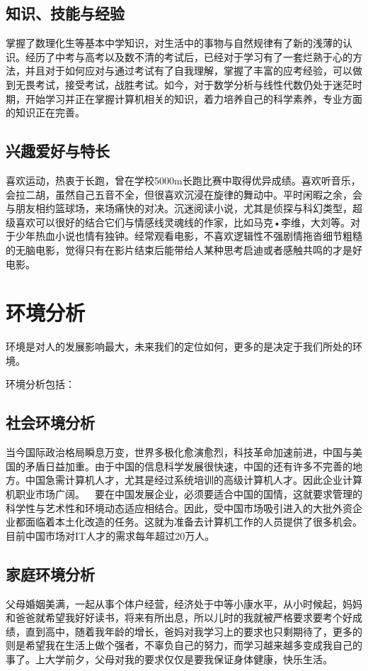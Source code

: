 \documentclass{article}
\begin{document}
\subsection{知识、技能与经验}
掌握了数理化生等基本中学知识，对生活中的事物与自然规律有了新的浅薄的认识。经历了中考与高考以及数不清的考试后，已经对于学习有了一套烂熟于心的方法，并且对于如何应对与通过考试有了自我理解，掌握了丰富的应考经验，可以做到无畏考试，接受考试，战胜考试。如今，对于数学分析与线性代数仍处于迷茫时期，开始学习并正在掌握计算机相关的知识，着力培养自己的科学素养，专业方面的知识正在完善。\par
\subsection{兴趣爱好与特长}
喜欢运动，热衷于长跑，曾在学校5000m长跑比赛中取得优异成绩。喜欢听音乐，会拉二胡，虽然自己五音不全，但很喜欢沉浸在旋律的舞动中。平时闲暇之余，会与朋友相约篮球场，来场痛快的对决。沉迷阅读小说，尤其是侦探与科幻类型，超级喜欢可以很好的结合它们与情感线灵魂线的作家，比如马克•李维，大刘等。对于少年热血小说也情有独钟。经常观看电影，不喜欢逻辑性不强剧情拖沓细节粗糙的无脑电影，觉得只有在影片结束后能带给人某种思考启迪或者感触共鸣的才是好电影。\par
\section{环境分析}
环境是对人的发展影响最大，未来我们的定位如何，更多的是决定于我们所处的环境。\par
环境分析包括：\par
\subsection{社会环境分析}
当今国际政治格局瞬息万变，世界多极化愈演愈烈，科技革命加速前进，中国与美国的矛盾日益加重。由于中国的信息科学发展很快速，中国的还有许多不完善的地方。中国急需计算机人才，尤其是经过系统培训的高级计算机人才。因此企业计算机职业市场广阔。  要在中国发展企业，必须要适合中国的国情，这就要求管理的科学性与艺术性和环境动态适应相结合。因此，受中国市场吸引进入的大批外资企业都面临着本土化改造的任务。这就为准备去计算机工作的人员提供了很多机会。目前中国市场对IT人才的需求每年超过20万人。\par
\subsection{家庭环境分析}
父母婚姻美满，一起从事个体户经营，经济处于中等小康水平，从小时候起，妈妈和爸爸就希望我好好读书，将来有所出息，所以儿时的我就被严格要求要考个好成绩，直到高中，随着我年龄的增长，爸妈对我学习上的要求也只剩期待了，更多的则是希望我在生活上做个强者，不辜负自己的努力，而学习越来越多变成我自己的事了。上大学前夕，父母对我的要求仅仅是要我保证身体健康，快乐生活。\par
\end{document}

